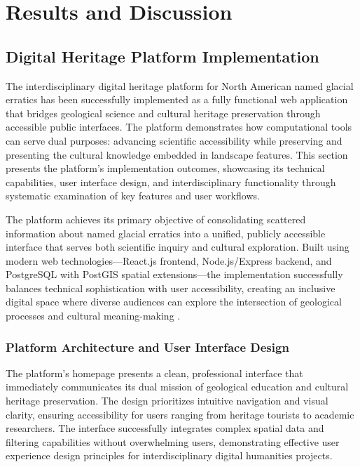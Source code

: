 \chapter{Results and Discussion}
\label{chapter:results}

\section{Digital Heritage Platform Implementation}
\label{sec:platform_implementation}

The interdisciplinary digital heritage platform for North American named glacial erratics has been successfully implemented as a fully functional web application that bridges geological science and cultural heritage preservation through accessible public interfaces. The platform demonstrates how computational tools can serve dual purposes: advancing scientific accessibility while preserving and presenting the cultural knowledge embedded in landscape features. This section presents the platform's implementation outcomes, showcasing its technical capabilities, user interface design, and interdisciplinary functionality through systematic examination of key features and user workflows.

The platform achieves its primary objective of consolidating scattered information about named glacial erratics into a unified, publicly accessible interface that serves both scientific inquiry and cultural exploration. Built using modern web technologies—React.js frontend, Node.js/Express backend, and PostgreSQL with PostGIS spatial extensions—the implementation successfully balances technical sophistication with user accessibility, creating an inclusive digital space where diverse audiences can explore the intersection of geological processes and cultural meaning-making \cite{Gregory2013, Bodenhamer2010}.

\subsection{Platform Architecture and User Interface Design}
\label{subsec:platform_architecture_results}

The platform's homepage presents a clean, professional interface that immediately communicates its dual mission of geological education and cultural heritage preservation. The design prioritizes intuitive navigation and visual clarity, ensuring accessibility for users ranging from heritage tourists to academic researchers. The interface successfully integrates complex spatial data and filtering capabilities without overwhelming users, demonstrating effective user experience design principles for interdisciplinary digital humanities projects.

